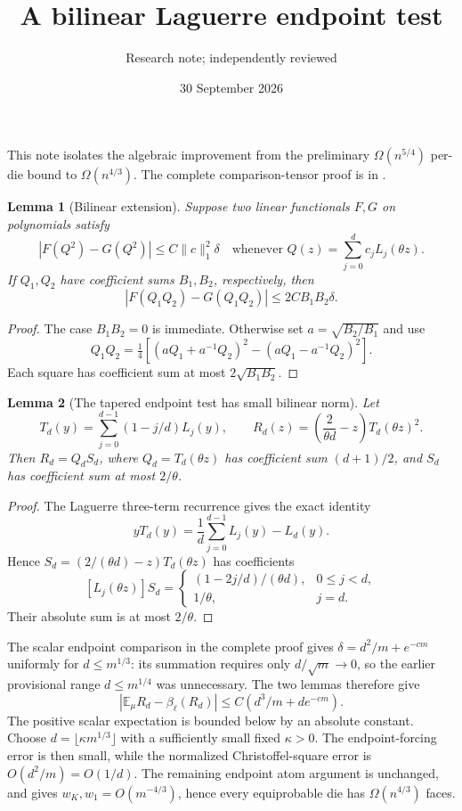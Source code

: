 \documentclass[11pt]{article}
\title{A bilinear Laguerre endpoint test}
\author{Research note; independently reviewed}
\date{30 September 2026}
\newtheorem{lemma}{Lemma}
\newcommand{\E}{\mathbb E}
\begin{document}
\maketitle
This note isolates the algebraic improvement from the preliminary
$\Omega(n^{5/4})$ per-die bound to $\Omega(n^{4/3})$. The complete
comparison-tensor proof is in
.

\begin{lemma}[Bilinear extension]
Suppose two linear functionals $F,G$ on polynomials satisfy
\[
 |F(Q^2)-G(Q^2)|\le C\|c\|_1^2\delta
 \quad\text{whenever }Q(z)=\sum_{j=0}^d c_j L_j(\theta z).
\]
If $Q_1,Q_2$ have coefficient sums $B_1,B_2$, respectively, then
\[
 |F(Q_1Q_2)-G(Q_1Q_2)|\le2C B_1B_2\delta.
\]
\end{lemma}
\begin{proof}
The case $B_1B_2=0$ is immediate. Otherwise set
$a=\sqrt{B_2/B_1}$ and use
\[
 Q_1Q_2=\tfrac14[(aQ_1+a^{-1}Q_2)^2
                         -(aQ_1-a^{-1}Q_2)^2].
\]
Each square has coefficient sum at most $2\sqrt{B_1B_2}$.
\end{proof}

\begin{lemma}[The tapered endpoint test has small bilinear norm]
Let
\[
 T_d(y)=\sum_{j=0}^{d-1}(1-j/d)L_j(y),\qquad
 R_d(z)=\left(\frac2{\theta d}-z\right)T_d(\theta z)^2.
\]
Then $R_d=Q_dS_d$, where $Q_d=T_d(\theta z)$ has coefficient sum
$(d+1)/2$, and $S_d$ has coefficient sum at most $2/\theta$.
\end{lemma}
\begin{proof}
The Laguerre three-term recurrence gives the exact identity
\[
 yT_d(y)=\frac1d\sum_{j=0}^{d-1}L_j(y)-L_d(y).
\]
Hence $S_d=(2/(\theta d)-z)T_d(\theta z)$ has coefficients
\[
 [L_j(\theta z)]S_d=
 \begin{cases}
 (1-2j/d)/(\theta d),&0\le j<d,\\
 1/\theta,&j=d.
 \end{cases}
\]
Their absolute sum is at most $2/\theta$.
\end{proof}

The scalar endpoint comparison in the complete proof gives
$\delta=d^2/m+e^{-cm}$ uniformly for $d\le m^{1/3}$: its summation
requires only $d/\sqrt m\to0$, so the earlier provisional range
$d\le m^{1/4}$ was unnecessary. The two lemmas therefore give
\[
 |\E_\mu R_d-\beta_\ell(R_d)|
       \le C(d^3/m+d e^{-cm}).
\]
The positive scalar expectation is bounded below by an absolute
constant. Choose $d=\lfloor\kappa m^{1/3}\rfloor$ with a sufficiently
small fixed $\kappa>0$. The endpoint-forcing error is then small,
while the normalized Christoffel-square error is
$O(d^2/m)=O(1/d)$. The remaining endpoint atom argument is unchanged,
and gives $w_K,w_1=O(m^{-4/3})$, hence every equiprobable die has
$\Omega(n^{4/3})$ faces.
\end{document}
